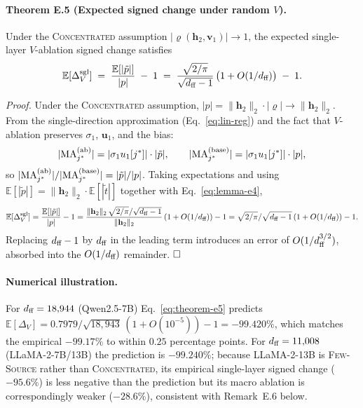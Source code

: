 \paragraph{Theorem E.5 (Expected signed change under random $V$).}
Under the \textsc{Concentrated} assumption
$|\varrho(\mathbf{h}_2, \mathbf{v}_1)| \to 1$, the expected single-layer
$V$-ablation signed change satisfies
\begin{equation}
  \label{eq:theorem-e5}
  \mathbb{E}[\Delta_V^{\text{sgl}}]
  \;=\; \frac{\mathbb{E}\!\left[|\tilde{p}|\right]}{|p|} \;-\; 1
  \;=\; \frac{\sqrt{2/\pi}}{\sqrt{d_{\text{ff}} - 1}}\,\bigl(1 + O(1/d_{\text{ff}})\bigr) \;-\; 1.
\end{equation}

\emph{Proof.} Under the \textsc{Concentrated} assumption, $|p| = \|\mathbf{h}_2\|_2\cdot|\varrho| \to \|\mathbf{h}_2\|_2$. From the single-direction
approximation (Eq.~\eqref{eq:lin-reg}) and the fact that $V$-ablation
preserves $\sigma_1$, $\mathbf{u}_1$, and the bias:
\[
  |\mathrm{MA}^{(\text{ab})}_{j^*}| = |\sigma_1 u_1[j^*]|\cdot|\tilde{p}|,
  \qquad
  |\mathrm{MA}^{(\text{base})}_{j^*}| = |\sigma_1 u_1[j^*]|\cdot|p|,
\]
so
$|\mathrm{MA}^{(\text{ab})}_{j^*}|/|\mathrm{MA}^{(\text{base})}_{j^*}| = |\tilde{p}|/|p|$.
Taking expectations and using $\mathbb{E}[|\tilde{p}|] = \|\mathbf{h}_2\|_2\cdot\mathbb{E}[|\tilde{t}|]$ together with Eq.~\eqref{eq:lemma-e4},
\[
  \mathbb{E}[\Delta_V^{\text{sgl}}]
  = \frac{\mathbb{E}[|\tilde{p}|]}{|p|} - 1
  = \frac{\|\mathbf{h}_2\|_2\,\sqrt{2/\pi}/\sqrt{d_{\text{ff}}-1}}{\|\mathbf{h}_2\|_2}\,(1 + O(1/d_{\text{ff}})) - 1
  = \sqrt{2/\pi}/\sqrt{d_{\text{ff}}-1}\,(1 + O(1/d_{\text{ff}})) - 1.
\]
Replacing $d_{\text{ff}} - 1$ by $d_{\text{ff}}$ in the leading term introduces an error
of $O(1/d_{\text{ff}}^{3/2})$, absorbed into the $O(1/d_{\text{ff}})$ remainder.
$\hfill\square$

\paragraph{Numerical illustration.}
For $d_{\text{ff}} = 18{,}944$ (Qwen2.5-7B) Eq.~\eqref{eq:theorem-e5} predicts
$\mathbb{E}[\Delta_V] = 0.7979/\sqrt{18{,}943}\,(1 + O(10^{-5})) - 1 = -99.420\%$, which matches the empirical
$-99.17\%$ to within $0.25$ percentage points. For $d_{\text{ff}} = 11{,}008$
(LLaMA-2-7B/13B) the prediction is $-99.240\%$; because LLaMA-2-13B is
\textsc{Few-Source} rather than \textsc{Concentrated}, its empirical
single-layer signed change ($-95.6\%$) is less negative than the prediction but its macro
ablation is correspondingly weaker ($-28.6\%$), consistent with
Remark~E.6 below.

